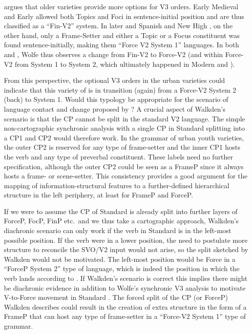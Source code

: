 \documentclass[output=paper]{langsci/langscibook}
\begin{document}
\noindent \citet{Wolfe:2017} argues that older  varieties provide more
options for V3 orders. Early Medieval  and Early  allowed
both Topics and Foci in sentence-initial position and are thus classified as a
\enquote{Fin-V2} system. In later  and Spanish and New High ,
on the other hand, only a Frame-Setter and either a Topic or a Focus
constituent was found sentence-initially, making them \enquote{Force V2 System
1} languages.  In both  and , Wolfe thus observes a change from
Fin-V2 to Force-V2 (and within Force-V2 from System 1 to System 2, which
ultimately happened in Modern  and ).

From this perspective, the optional V3 orders in the
 urban varieties could indicate that this variety of  is
in transition (again) from a Force-V2 System 2 (back) to System 1. Would this
typology be appropriate for the scenario of language contact and change
proposed by \citet{Walkden:2017}? A crucial aspect of Walkden's scenario is
that the CP cannot be split in the standard V2 language. The
simple non-cartographic synchronic analysis with a single CP in Standard
 splitting into a CP1 and CP2 would therefore work.  In the grammar
of  urban youth varieties, the outer CP2 is reserved for any type of
frame-setter and the inner CP1 hosts the verb and any type of preverbal
constituent. These labels need no further specification, although the outer CP2
could be seen as a FrameP since it always hosts a frame- or scene-setter. This
consistency provides a good argument for the  mapping of information-structural
features to a further-defined hierarchical structure in the left periphery, at
least for FrameP and ForceP.

If we were to assume the CP of Standard  is already split into
further layers of ForceP, FocP, FinP etc.\ and we thus take a cartographic
approach, Walkden's diachronic scenario can only work if the verb in Standard
 is in the left-most possible position. If the verb were in a lower
position, the need to postulate more structure to reconcile the SVO/V2 input
would not arise, so the split sketched by Walkden would not be motivated. The
left-most position would be Force in a \enquote{ForceP System 2} type of
language, which is indeed the position in which the verb lands according to
\citet{Wolfe:2017}. If Walkden's scenario is correct this implies there might
be diachronic evidence in addition to Wolfe's synchronic V3
analysis to motivate V-to-Force movement in Standard
. The forced split of the CP (or ForceP) Walkden describes could
result in the creation of extra structure in the form of a FrameP that can host
any type of frame-setter in a \enquote{Force-V2 System 1} type of grammar.
\end{document}
